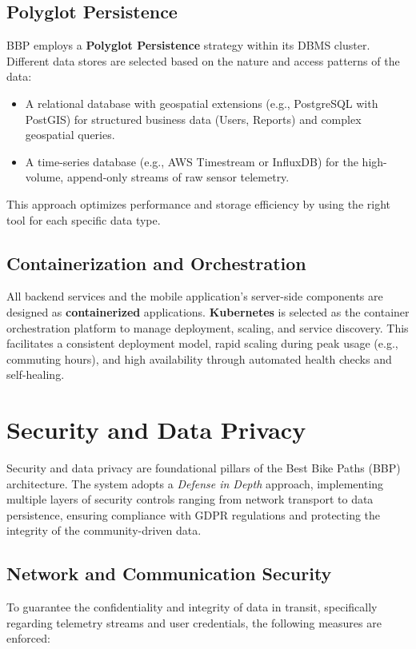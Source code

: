 \subsection{Polyglot Persistence}
BBP employs a \textbf{Polyglot Persistence} strategy within its DBMS cluster. Different data stores are selected based on the nature and access patterns of the data:
\begin{itemize}
    \item A relational database with geospatial extensions (e.g., PostgreSQL with PostGIS) for structured business data (Users, Reports) and complex geospatial queries.
    \item A time-series database (e.g., AWS Timestream or InfluxDB) for the high-volume, append-only streams of raw sensor telemetry.
\end{itemize}
This approach optimizes performance and storage efficiency by using the right tool for each specific data type.

\subsection{Containerization and Orchestration}
All backend services and the mobile application's server-side components are designed as \textbf{containerized} applications. \textbf{Kubernetes} is selected as the container orchestration platform to manage deployment, scaling, and service discovery. This facilitates a consistent deployment model, rapid scaling during peak usage (e.g., commuting hours), and high availability through automated health checks and self-healing.
\section{Security and Data Privacy}
\label{sec:security}

Security and data privacy are foundational pillars of the Best Bike Paths (BBP) architecture. The system adopts a \textit{Defense in Depth} approach, implementing multiple layers of security controls ranging from network transport to data persistence, ensuring compliance with GDPR regulations and protecting the integrity of the community-driven data.

\subsection{Network and Communication Security}
To guarantee the confidentiality and integrity of data in transit, specifically regarding telemetry streams and user credentials, the following measures are enforced:

